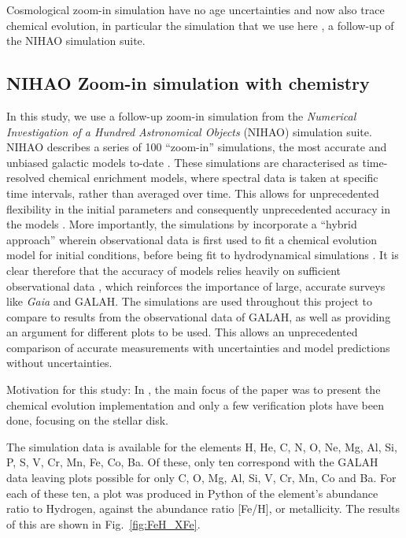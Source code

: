 \documentclass[fleqn,usenatbib]{mnras}
\newcommand{\Gaia}{\textit{Gaia}\xspace} %
\begin{document}
Cosmological zoom-in simulation have no age uncertainties and now also trace chemical evolution, in particular the simulation that we use here \citep{Buck2021}, a follow-up of the NIHAO simulation suite.

\subsection{NIHAO Zoom-in simulation with chemistry}

In this study, we use a follow-up zoom-in simulation from the \textit{Numerical Investigation of a Hundred Astronomical Objects} (NIHAO) simulation suite. NIHAO describes a series of 100 “zoom-in” simulations, the most accurate and unbiased galactic models to-date \citep{Wang2015}. These simulations are characterised as time-resolved chemical enrichment models, where spectral data is taken at specific time intervals, rather than averaged over time. This allows for unprecedented flexibility in the initial parameters and consequently unprecedented accuracy in the models \citep{Buck2021}. 
More importantly, the simulations by \citet{Buck2021} incorporate a “hybrid approach” wherein observational data is first used to fit a chemical evolution model for initial conditions, before being fit to hydrodynamical simulations \citep{Buck2021}. It is clear therefore that the accuracy of models relies heavily on sufficient observational data \citep{Wang2015}, which reinforces the importance of large, accurate surveys like \Gaia and GALAH. The simulations are used throughout this project to compare to results from the observational data of GALAH, as well as providing an argument for different plots to be used. This allows an unprecedented comparison of accurate measurements with uncertainties and model predictions without uncertainties.

Motivation for this study: In \citet{Buck2021}, the main focus of the paper was to present the chemical evolution implementation and only a few verification plots have been done, focusing on the stellar disk.

The simulation data is available for the elements H, He, C, N, O, Ne, Mg, Al, Si, P, S, V, Cr, Mn, Fe, Co, Ba. Of these, only ten correspond with the GALAH data leaving plots possible for only C, O, Mg, Al, Si, V, Cr, Mn, Co and Ba. For each of these ten, a plot was produced in Python of the element's abundance ratio to Hydrogen, against the abundance ratio [Fe/H], or metallicity. The results of this are shown in Fig.~\ref{fig:FeH_XFe}.
\end{document}
